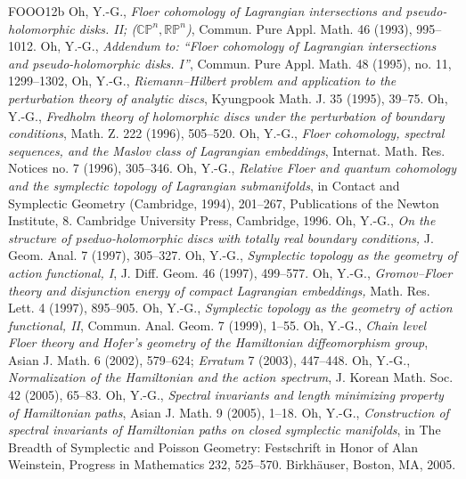 \begin{thebibliography}{FOOO12b}
 Oh, Y.-G., \textit{Floer cohomology of Lagrangian intersections and pseudo-holomorphic disks. II; ($\mathbb{CP}^n,\mathbb{RP}^n$)}, Commun. Pure Appl. Math. 46 (1993), 995--1012.
 Oh, Y.-G., \textit{Addendum to: \textquotedblleft{}Floer cohomology of Lagrangian intersections and pseudo-holomorphic disks. I\textquotedblright{}}, Commun. Pure Appl. Math. 48 (1995), no. 11, 1299--1302,
 Oh, Y.-G., \textit{Riemann--Hilbert problem and application to the perturbation theory of analytic discs}, Kyungpook Math. J. 35 (1995), 39--75.
 Oh, Y.-G., \textit{Fredholm theory of holomorphic discs under the perturbation of boundary conditions}, Math. Z. 222 (1996), 505--520.
 Oh, Y.-G., \textit{Floer cohomology, spectral sequences, and the Maslov class of Lagrangian embeddings}, Internat. Math. Res. Notices no. 7 (1996), 305--346.
 Oh, Y.-G., \textit{Relative Floer and quantum cohomology and the symplectic topology of Lagrangian submanifolds}, in Contact and Symplectic Geometry (Cambridge, 1994), 201--267, Publications of the Newton Institute, 8. Cambridge University Press, Cambridge, 1996.
 Oh, Y.-G., \textit{On the structure of pseduo-holomorphic discs with totally real boundary conditions,} J. Geom. Anal. 7 (1997), 305--327.
 Oh, Y.-G., \textit{Symplectic topology as the geometry of action functional, I}, J. Diff. Geom. 46 (1997), 499--577.
 Oh, Y.-G., \textit{Gromov--Floer theory and disjunction energy of compact Lagrangian embeddings,} Math. Res. Lett. 4 (1997), 895--905.
 Oh, Y.-G., \textit{Symplectic topology as the geometry of action functional, II}, Commun. Anal. Geom. 7 (1999), 1--55.
 Oh, Y.-G., \textit{Chain level Floer theory and Hofer\textquoteright{}s geometry of the Hamiltonian diffeomorphism group}, Asian J. Math. 6 (2002), 579--624; \textit{Erratum} 7 (2003), 447--448.
 Oh, Y.-G., \textit{Normalization of the Hamiltonian and the action spectrum}, J. Korean Math. Soc. 42 (2005), 65--83.
 Oh, Y.-G., \textit{Spectral invariants and length minimizing property of Hamiltonian paths}, Asian J. Math. 9 (2005), 1--18.
 Oh, Y.-G., \textit{Construction of spectral invariants of Hamiltonian paths on closed symplectic manifolds}, in The Breadth of Symplectic and Poisson Geometry: Festschrift in Honor of Alan Weinstein, Progress in Mathematics 232, 525--570. Birkhäuser, Boston, MA, 2005.

\end{thebibliography}
